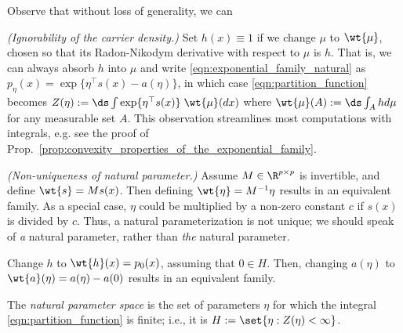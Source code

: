 \documentclass{article} %
\newcommand{\normalizerFunction}{Z}
\newcommand{\logNormalizerFunction}{a}
\newcommand{\sufficientStatsFunction}{s}
\newcommand{\carrierDensity}{h}
\newcommand{\naturalParamSpace}{H}
\begin{document}
\begin{remark}
Observe \cite{chua2019stats} that without loss of generality, we can 
\begin{alphabate} 
\item \label{item:ignorabiity_of_carrier_density} \textit{(Ignorability of the carrier density.)} Set $\carrierDensity(x) \equiv 1$ if we change $\mu$ to $\wt{\mu}$, chosen so that its Radon-Nikodym derivative with respect to $\mu$ is $\carrierDensity$. That is, we can always absorb $\carrierDensity$ into $\mu$ and write \eqref{eqn:exponential_family_natural} as  $p_\eta(x) = \exp \{ \eta^\top \sufficientStatsFunction(x) - \logNormalizerFunction(\eta)\}$, in which case \eqref{eqn:partition_function} becomes $\normalizerFunction(\eta) := \ds\int  \exp \{ \eta^\top \sufficientStatsFunction(x)  \} \; \wt{\mu} (dx) $ where $\wt{\mu}(A) := \ds\int_A \carrierDensity d\mu$ for any measurable set $A$.   This observation streamlines most computations with integrals, e.g. see the proof of Prop.~\ref{prop:convexity_properties_of_the_exponential_family}. 
\item \label{item:nonuniqueness_of_natural_parameter} \textit{(Non-uniqueness of natural parameter.)} Assume $M \in \R^{p \times p}$ is invertible, and define $\wt{\sufficientStatsFunction} = M \sufficientStatsFunction(x)$. Then defining $\wt{\eta} = M^{-1} \eta$ results in an equivalent family.  As a special case, $\eta$ could be multiplied by a non-zero constant $c$ if $\sufficientStatsFunction(x)$ is divided by $c$.  Thus, a natural parameterization is not unique; we should speak of \textit{a} natural parameter,  rather than \textit{the} natural parameter.
\item Change $\carrierDensity$ to $\wt{\carrierDensity}(x) = p_0(x)$, assuming that $0 \in \naturalParamSpace$.  Then, changing $\logNormalizerFunction(\eta)$ to $\wt{\logNormalizerFunction}(\eta) = \logNormalizerFunction(\eta) - \logNormalizerFunction(0)$ results in an equivalent family. 
\end{alphabate}
\label{rk:alternate_constructions_for_the_exponential_family}
\end{remark}


\begin{definition}
The \textit{natural parameter space} is the set of parameters $\eta$ for which the integral \eqref{eqn:partition_function} is finite; i.e., it is $\naturalParamSpace:=\set{\eta : \normalizerFunction(\eta) < \infty}$.
\end{definition}
\end{document}
